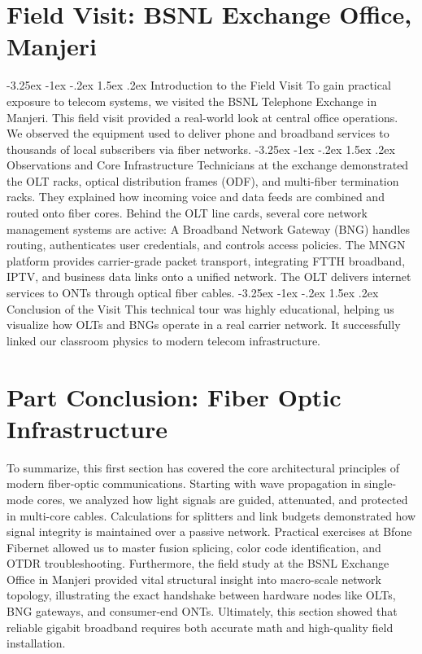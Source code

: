 \documentclass[11pt,a4paper]{report}
\makeatletter
\renewcommand{\section}{\@startsection{section}{1}{\z@}%
  {-3.25ex \@plus -1ex \@minus -.2ex}%
  {1.5ex \@plus.2ex}%
  {\normalfont\Large\bfseries\color{primaryColor}}}
\makeatother
\begin{document}
\chapter{Field Visit: BSNL Exchange Office, Manjeri}
\section{Introduction to the Field Visit}
To gain practical exposure to telecom systems, we visited the BSNL Telephone Exchange in Manjeri. This field visit provided a real-world look at central office operations. We observed the equipment used to deliver phone and broadband services to thousands of local subscribers via fiber networks.
\section{Observations and Core Infrastructure}
Technicians at the exchange demonstrated the OLT racks, optical distribution frames (ODF), and multi-fiber termination racks. They explained how incoming voice and data feeds are combined and routed onto fiber cores. Behind the OLT line cards, several core network management systems are active: A Broadband Network Gateway (BNG) handles routing, authenticates user credentials, and controls access policies. The MNGN platform provides carrier-grade packet transport, integrating FTTH broadband, IPTV, and business data links onto a unified network. The OLT delivers internet services to ONTs through optical fiber cables.
\section{Conclusion of the Visit}
This technical tour was highly educational, helping us visualize how OLTs and BNGs operate in a real carrier network. It successfully linked our classroom physics to modern telecom infrastructure.
\chapter*{Part Conclusion: Fiber Optic Infrastructure}
To summarize, this first section has covered the core architectural principles of modern fiber-optic communications. Starting with wave propagation in single-mode cores, we analyzed how light signals are guided, attenuated, and protected in multi-core cables. Calculations for splitters and link budgets demonstrated how signal integrity is maintained over a passive network. Practical exercises at Bfone Fibernet allowed us to master fusion splicing, color code identification, and OTDR troubleshooting. Furthermore, the field study at the BSNL Exchange Office in Manjeri provided vital structural insight into macro-scale network topology, illustrating the exact handshake between hardware nodes like OLTs, BNG gateways, and consumer-end ONTs. Ultimately, this section showed that reliable gigabit broadband requires both accurate math and high-quality field installation.
\end{document}
